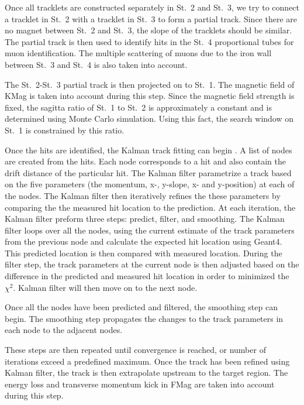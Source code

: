 \documentclass[../main.tex]{subfiles}
\begin{document}
Once all tracklets are constructed separately in St.~2 and St.~3, we try to connect a tracklet
in St.~2 with a tracklet in St.~3 to form a partial track. Since there are no magnet between
St.~2 and St.~3, the slope of the tracklets should be similar. The partial track is then used to
identify hits in the St.~4 proportional tubes for muon identification. The multiple scattering of
muons due to the iron wall between St.~3 and St.~4 is also taken into account.

The St.~2-St.~3 partial track is then projected on to St.~1. The magnetic field of KMag is taken into
account during this step. Since the magnetic field strength is fixed, the sagitta ratio of St.~1 to
St.~2 is approximately a constant and is determined using Monte Carlo simulation. Using this fact,
the search window on St.~1 is constrained by this ratio.

Once the hits are identified, the Kalman track fitting can begin \cite{kalman1960}. A list of nodes are created
from the hits. Each node corresponds to a hit and also contain the drift distance of the particular hit.
The Kalman filter parametrize a track based on the five parameters (the momentum, x-, y-slope, x- and y-position)
at each of the nodes.
The Kalman filter then iteratively refines the these parameters by comparing the the measured hit location
to the prediction. At each iteration, the Kalman filter preform three steps: predict, filter, and smoothing.
The Kalman filter loops over all the nodes, using the current estimate of the track parameters
from the previous node and calculate the expected hit location using Geant4. This predicted location
is then compared with measured location. During the filter step, the track parameters at the current node is
then adjusted based on the difference in the predicted and measured hit location in order to minimized
the $\chi^2$. Kalman filter will then move on to the next node.

Once all the nodes have been predicted and filtered, the smoothing step can begin. The smoothing step propagates
the changes to the track parameters in each node to the adjacent nodes.

These steps are then repeated until convergence is reached, or number of iterations exceed a predefined
maximum.
Once the track has been refined using Kalman filter, the track is then extrapolate upstream to the target
region. The energy loss and transverse momentum kick in FMag are taken into account during this step.
\end{document}
